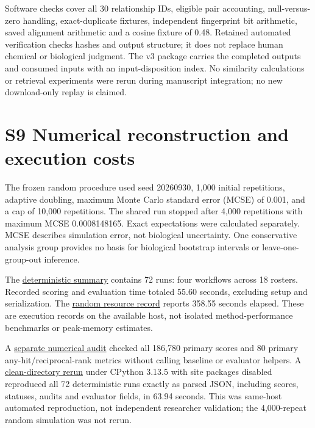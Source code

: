 \documentclass[
  10pt,
  a4paper,
]{article}
\begin{document}
Software checks cover all 30 relationship IDs, eligible pair accounting, null-versus-zero handling, exact-duplicate fixtures, independent fingerprint bit arithmetic, saved alignment arithmetic and a cosine fixture of 0.48. Retained automated verification checks hashes and output structure; it does not replace human chemical or biological judgment. The v3 package carries the completed outputs and consumed inputs with an input-disposition index. No similarity calculations or retrieval experiments were rerun during manuscript integration; no new download-only replay is claimed.

\section{S9 Numerical reconstruction and execution costs}\label{s9-numerical-reconstruction-and-execution-costs}

The frozen random procedure used seed 20260930, 1,000 initial repetitions, adaptive doubling, maximum Monte Carlo standard error (MCSE) of 0.001, and a cap of 10,000 repetitions. The shared run stopped after 4,000 repetitions with maximum MCSE 0.0008148165. Exact expectations were calculated separately. MCSE describes simulation error, not biological uncertainty. One conservative analysis group provides no basis for biological bootstrap intervals or leave-one-group-out inference.

The \href{https://github.com/vinvomero/fungallink-benchmark/blob/main/data/processed/source-selected-gcf-analysis-v1-results/deterministic-summary.json}{deterministic summary} contains 72 runs: four workflows across 18 rosters. Recorded scoring and evaluation time totaled 55.60 seconds, excluding setup and serialization. The \href{https://github.com/vinvomero/fungallink-benchmark/blob/main/data/processed/source-selected-gcf-analysis-v1-results/random-resources.json}{random resource record} reports 358.55 seconds elapsed. These are execution records on the available host, not isolated method-performance benchmarks or peak-memory estimates.

A \href{https://github.com/vinvomero/fungallink-benchmark/blob/main/data/processed/source-selected-gcf-analysis-v1-results/primary-independent-audit.json}{separate numerical audit} checked all 186,780 primary scores and 80 primary any-hit/reciprocal-rank metrics without calling baseline or evaluator helpers. A \href{https://github.com/vinvomero/fungallink-benchmark/blob/main/data/processed/source-selected-gcf-analysis-v1-results/clean-deterministic-rerun.json}{clean-directory rerun} under CPython 3.13.5 with site packages disabled reproduced all 72 deterministic runs exactly as parsed JSON, including scores, statuses, audits and evaluator fields, in 63.94 seconds. This was same-host automated reproduction, not independent researcher validation; the 4,000-repeat random simulation was not rerun.
\end{document}

